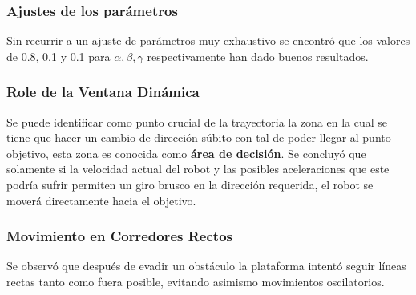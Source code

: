 \documentclass[12pt]{article}
\begin{document}
\subsubsection*{Ajustes de los parámetros}
Sin recurrir a un ajuste de parámetros muy exhaustivo se encontró que los valores de 0.8, 0.1 y 0.1 para $\alpha, \beta, \gamma$ respectivamente han dado buenos resultados.

\subsubsection*{Role de la Ventana Dinámica}
Se puede identificar como punto crucial de la trayectoria la zona en la cual se tiene que hacer un cambio de dirección súbito con tal de poder llegar al punto objetivo, esta zona es conocida como \textbf{área de decisión}. Se concluyó que solamente si la velocidad actual del robot y las posibles aceleraciones que este podría sufrir permiten un giro brusco en la dirección requerida, el robot se moverá directamente hacia el objetivo.

\subsubsection*{Movimiento en Corredores Rectos}
Se observó que después de evadir un obstáculo la plataforma intentó seguir líneas rectas tanto como fuera posible, evitando asimismo movimientos oscilatorios.
\end{document}
